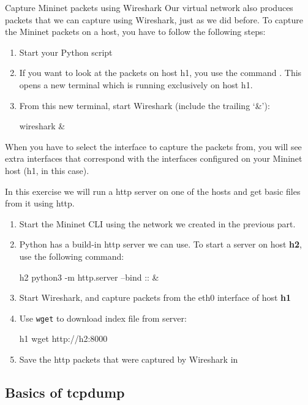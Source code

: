 \begin{exercise}{Capture Mininet packets using Wireshark}
Our virtual network also produces packets that we can capture using Wireshark, just as we did before. To capture the Mininet packets on a host, you have to follow the following steps:
\begin{enumerate}
\item Start your Python script
\item If you want to look at the packets on host h1, you use the command . This opens a new terminal which is running exclusively on host h1.
\item From this new terminal, start Wireshark (include the trailing `\&'):
\begin{cmdblock}[gobble=1]
	wireshark &
\end{cmdblock}
\end{enumerate}

When you have to select the interface to capture the packets from, you will see extra interfaces that correspond with the interfaces configured on your Mininet host (h1, in this case).

In this exercise we will run a http server on one of the hosts and get basic files from it using \ac{http}.
\begin{enumerate}
	\item Start the Mininet CLI using the network we created in the previous part.
	\item Python has a build-in http server we can use. To start a server on host \textbf{h2}, use the following command:
\begin{cmdblock}[gobble=1]
	h2 python3 -m http.server --bind :: &
\end{cmdblock}
	\item Start Wireshark, and capture packets from the eth0 interface of host \textbf{h1}
	\item Use \texttt{wget} to download index file from server:
\begin{cmdblock}[gobble=1]
	h1 wget http://h2:8000
\end{cmdblock}
	\item Save the \ac{http} packets that were captured by Wireshark in 
\end{enumerate}

\end{exercise}



\newpage
\subsection{Basics of tcpdump}

